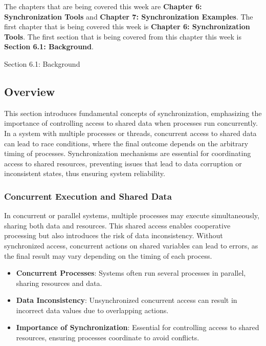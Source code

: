 The chapters that are being covered this week are \textbf{Chapter 6: Synchronization Tools} and \textbf{Chapter 7: Synchronization Examples}. The first chapter that is being covered this week is
\textbf{Chapter 6: Synchronization Tools}. The first section that is being covered from this chapter this week is \textbf{Section 6.1: Background}.

\begin{notes}{Section 6.1: Background}
    \subsection*{Overview}

    This section introduces fundamental concepts of synchronization, emphasizing the importance of controlling access to shared data when processes run concurrently. In a system with multiple processes 
    or threads, concurrent access to shared data can lead to race conditions, where the final outcome depends on the arbitrary timing of processes. Synchronization mechanisms are essential for coordinating 
    access to shared resources, preventing issues that lead to data corruption or inconsistent states, thus ensuring system reliability.
    
    \subsubsection*{Concurrent Execution and Shared Data}
    
    In concurrent or parallel systems, multiple processes may execute simultaneously, sharing both data and resources. This shared access enables cooperative processing but also introduces the risk of 
    data inconsistency. Without synchronized access, concurrent actions on shared variables can lead to errors, as the final result may vary depending on the timing of each process.
    
    \begin{highlight}
    
        \begin{itemize}
            \item \textbf{Concurrent Processes}: Systems often run several processes in parallel, sharing resources and data.
            \item \textbf{Data Inconsistency}: Unsynchronized concurrent access can result in incorrect data values due to overlapping actions.
            \item \textbf{Importance of Synchronization}: Essential for controlling access to shared resources, ensuring processes coordinate to avoid conflicts.
        \end{itemize}
    

\end{highlight}
\end{notes}

